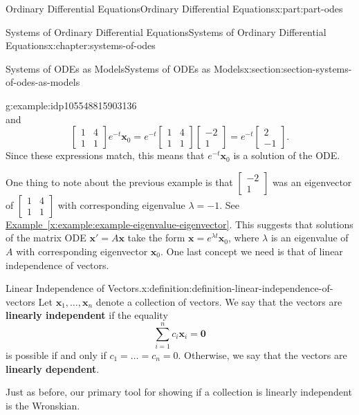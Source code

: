 \documentclass[twoside,10pt,]{book}
\newcommand{\xreffont}{\relax}
\newcommand{\terminology}[1]{\textbf{#1}}
\numberwithin{equation}{part}
\renewcommand{\vec}[1]{\mathbf{#1}}
\newcommand{\amp}{&}
\begin{document}
\begin{partptx}{Ordinary Differential Equations}{}{Ordinary Differential Equations}{}{}{x:part:part-odes}
\begin{chapterptx}{Systems of Ordinary Differential Equations}{}{Systems of Ordinary Differential Equations}{}{}{x:chapter:systems-of-odes}
\begin{sectionptx}{Systems of ODEs as Models}{}{Systems of ODEs as Models}{}{}{x:section:section-systems-of-odes-as-models}
\begin{example}{}{g:example:idp105548815903136}
\begin{equation*}
\end{equation*}
and%
\begin{equation*}
\begin{bmatrix}1\amp 4\\1\amp 1\end{bmatrix}e^{-t}\vec{x}_{0} = e^{-t}\begin{bmatrix}1\amp 4\\1\amp 1\end{bmatrix}\begin{bmatrix}-2\\1\end{bmatrix} = e^{-t}\begin{bmatrix}2\\-1\end{bmatrix}.
\end{equation*}
Since these expressions match, this means that \(e^{-t}\vec{x}_{0}\) is a solution of the ODE.%
\end{example}
One thing to note about the previous example is that \(\begin{bmatrix}-2\\1\end{bmatrix}\) was an eigenvector of \(\begin{bmatrix}1\amp 4\\1\amp 1\end{bmatrix}\) with corresponding eigenvalue \(\lambda=-1\). See \hyperref[x:example:example-eigenvalue-eigenvector]{Example~{\xreffont\ref{x:example:example-eigenvalue-eigenvector}}}. This suggests that solutions of the matrix ODE \(\vec{x}' = A\vec{x}\) take the form \(\vec{x} = e^{\lambda t}\vec{x}_{0}\), where \(\lambda\) is an eigenvalue of \(A\) with corresponding eigenvector \(\vec{x}_{0}\). One last concept we need is that of linear independence of vectors.%
\begin{definition}{Linear Independence of Vectors.}{x:definition:definition-linear-independence-of-vectors}%
%
Let \(\vec{x}_{1},\dots,\vec{x}_{n}\) denote a collection of vectors. We say that the vectors are \terminology{linearly independent} if the equality%
\begin{equation*}
\sum_{i=1}^{n}c_{i}\vec{x}_{i} = \vec{0}
\end{equation*}
is possible if and only if \(c_{1}=\dots=c_{n}=0\). Otherwise, we say that the vectors are \terminology{linearly dependent}.%
\end{definition}
Just as before, our primary tool for showing if a collection is linearly independent is the Wronskian.%

\end{sectionptx}
\end{chapterptx}
\end{partptx}
\end{document}
